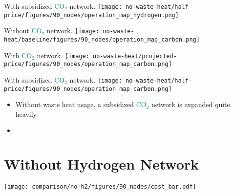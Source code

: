 \documentclass[12pt, aspectratio=169]{beamer}
\newcommand{\carbon}{\textcolor{teal}{CO$_2$}}
\begin{document}
\begin{frame}
    \begin{center}
    With subsidized \carbon{} network.
    \texttt{[image: no-waste-heat/half-price/figures/90\_nodes/operation\_map\_hydrogen.png]}
    \end{center}
\end{frame}


\begin{frame}
    \begin{center}
    Without \carbon{} network.
    \texttt{[image: no-waste-heat/baseline/figures/90\_nodes/operation\_map\_carbon.png]}
    \end{center}
\end{frame}


\begin{frame}
    \begin{center}
    With \carbon{} network.
    \texttt{[image: no-waste-heat/projected-price/figures/90\_nodes/operation\_map\_carbon.png]}
    \end{center}
\end{frame}

\begin{frame}
    \begin{center}
    With subsidized \carbon{} network.
    \texttt{[image: no-waste-heat/half-price/figures/90\_nodes/operation\_map\_carbon.png]}
    \end{center}
\end{frame}


\begin{frame}
    \begin{itemize}
        \item Without waste heat usage, a subsidized \carbon{} network is expanded quite heavily.
        \item
    \end{itemize}

\end{frame}


\section{Without Hydrogen Network}

\begin{frame}
    \texttt{[image: comparison/no-h2/figures/90\_nodes/cost\_bar.pdf]}
\end{frame}
\end{document}
